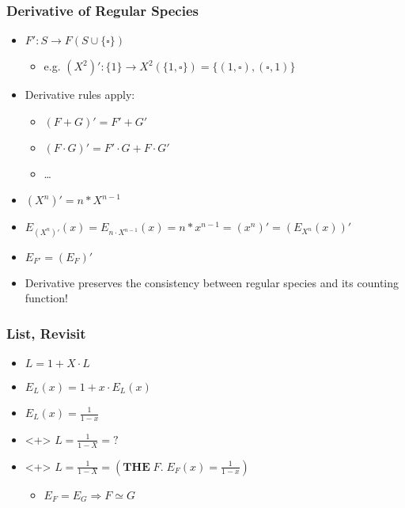 \begin{frame}
\frametitle{Derivative of Regular Species}

\begin{itemize}
\item $F': S \rightarrow F(S\cup\{\square\}) $
\begin{itemize}
\item e.g. $(X^2)': \{1\} \rightarrow X^2(\{1, \square\}) = \{(1,\square), (\square, 1)\}$
\end{itemize}

\item Derivative rules apply:
\begin{itemize}
\item $(F+G)'=F'+G'$
\item $(F\cdot G)' = F'\cdot G + F \cdot G'$
\item \dots
\end{itemize}

\item $(X^n)' = n * X^{n-1}$
\item $E_{(X^n)'}(x) = E_{n\cdot X^{n-1}}(x) = n * x^{n-1} = (x^n)' = (E_{X^n}(x))'$
\item $E_{F'} = (E_F)'$
\item Derivative preserves the consistency between regular species and its counting function!
\end{itemize}
\end{frame}

\begin{frame}
\frametitle{List, Revisit}

\begin{itemize}
\item $L = 1 + X \cdot L$
\item $E_L(x) = 1 + x \cdot E_L(x)$
\item $E_L(x) = \frac{1}{1-x}$
\item 
\begin{onlyenv}<+>
$L = \frac{1}{1 - X} = ?$
\end{onlyenv}

\item 
\begin{onlyenv}<+>
$L = \frac{1}{1 - X} = (\textbf{THE}\; F.\; E_F(x) = \frac{1}{1-x})$
\end{onlyenv}

\begin{itemize}
\item $E_F = E_G \Longrightarrow F \simeq G$ 
\end{itemize}
\end{itemize}
\end{frame}
